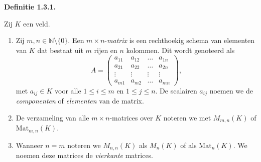 \documentclass[10pt,a4paper]{article}
\newenvironment{res}[1]{%
  \par\noindent\textbf{Definitie #1.}~\ignorespaces
}{%
  \par\vspace{2pt}\normalfont
}
\begin{document}
\begin{res}{1.3.1}
Zij $K$ een veld.
\begin{enumerate}[label=(\arabic*),leftmargin=1.8em,itemsep=1pt,topsep=1pt]
\item Zij $m,n\in\mathbb N\setminus\{0\}$. Een $m\times n$-\textit{matrix} is een rechthoekig schema van elementen van $K$ dat bestaat uit $m$ rijen en $n$ kolommen. Dit wordt genoteerd als
\[
A=\begin{pmatrix} a_{11}&a_{12}&\dots&a_{1n}\\ a_{21}&a_{22}&\dots&a_{2n}\\ \vdots&\vdots&\vdots&\vdots\\ a_{m1}&a_{m2}&\dots&a_{mn}\end{pmatrix},
\]
met $a_{ij}\in K$ voor alle $1\le i\le m$ en $1\le j\le n$. De scalairen $a_{ij}$ noemen we de \textit{componenten} of \textit{elementen} van de matrix.
\item De verzameling van alle $m\times n$-matrices over $K$ noteren we met $M_{m,n}(K)$ of $\mathrm{Mat}_{m,n}(K)$.
\item Wanneer $n=m$ noteren we $M_{n,n}(K)$ als $M_n(K)$ of als $\mathrm{Mat}_n(K)$. We noemen deze matrices de \textit{vierkante} matrices.
\end{enumerate}
\end{res}
\end{document}
